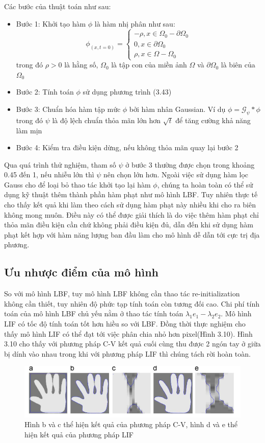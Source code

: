 \documentclass[12pt, oneside, a4]{book}
\newcommand{\G}{\mathcal G}
\begin{document}
Các bước của thuật toán như sau:
\begin{itemize}
\item Bước 1: Khởi tạo hàm $\phi$ là hàm nhị phân như sau:
\begin{equation*}
\phi_(x,t=0)=\begin{cases}
-\rho, x\in \Omega_0 -\partial \Omega_0\\
0, x\in \partial \Omega_0\\
\rho, x\in \Omega- \Omega_0
\end{cases}
\end{equation*}
 trong đó $\rho>0$ là hằng số, $\Omega_0$ là tập con  của miền ảnh $\Omega$ và $\partial \Omega_0$ là biên của $\Omega_0$
 \item Bước 2: Tính toán $\phi$ sử dụng phương trình (3.43)
 \item Bước 3: Chuẩn hóa hàm tập mức $\phi$ bởi hàm nhân Gaussian. Ví dụ $\phi=\G_{\psi}*\phi$ trong đó $\psi$ là độ lệch chuẩn thỏa mãn lớn hơn $\sqrt{t}$ để tăng cường khả năng làm mịn
 \item Bước 4: Kiểm tra điều kiện dừng, nếu không thỏa mãn quay lại bước 2
\end{itemize}
Qua quá trình thử nghiệm, tham số $\psi$ ở bước 3 thường được chọn trong khoảng 0.45 đến 1, nếu nhiễu lớn thì $\psi$ nên chọn lớn hơn.
Ngoài việc sử dụng hàm lọc Gauss cho để loại bỏ thao tác khởi tạo lại hàm $\phi$, chúng ta hoàn toàn có thể sử dụng kỹ thuật thêm thành phần hàm phạt như mô hình LBF. Tuy nhiên thực tế cho thấy kết quả khi làm theo cách sử dụng hàm phạt này nhiều khi cho ra biên không mong muôn. Điều này có thể được giải thích là do việc thêm hàm phạt chỉ thỏa mãn điều kiện cần chứ không phải điều kiện đủ, dẫn đến khi sử dụng hàm phạt kết hợp với hàm năng lượng ban đầu làm cho mô hình dễ dẫn tới cực trị địa phương.
\subsection{Ưu nhược điểm của mô hình}
So với mô hình LBF, tuy mô hình LBF không cần thao tác re-initialization không cần thiết, tuy nhiên độ phức tạp tính toán còn tương đối cao. Chi phí tính toán của mô hình LBF chủ yếu nằm ở thao tác tính toán $\lambda_1 e_1-\lambda_2 e_2$. Mô hình LIF có tốc độ tính toán tốt hơn hiều so với LBF. Đồng thời thực nghiệm cho thấy mô hình LIF có thể đạt tới việc phân chia nhỏ hơn pixel(Hình 3.10). Hình 3.10 cho thấy với phương pháp C-V kết quả cuối cùng thu được 2 ngón tay ở giữa bị dính vào nhau trong khi với phương pháp LIF thì chúng tách rời hoàn toàn.
\begin{center}
\begin{figure}
\includegraphics[scale=0.7]{figure/subpixel.png}
\caption{Hình b và c thể hiện kết quả của phương pháp C-V, hình  d và e thể hiện kết quả của phương pháp LIF}
\end{figure}

\end{center}   
\end{document}

